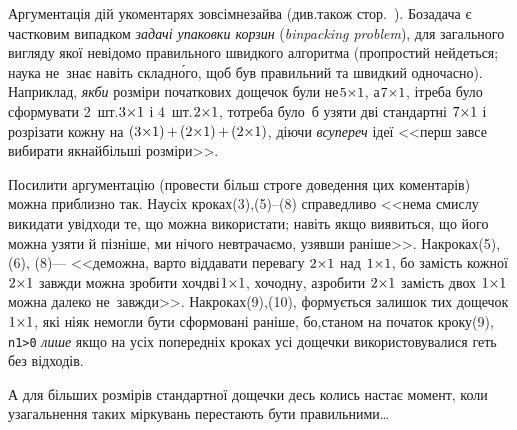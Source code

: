 Аргументація дій у\nolinebreak[3] коментарях зовсім\nolinebreak[1] не\nolinebreak[3] зайва
(див.\nolinebreak[2] також стор.~\pageref{text:need-or-no-need-to-prove}). Бо\nolinebreak[3] задача є частковим випадком \emph{задачі упаковки корзин} (\emph{bin\nolinebreak[1] packing problem}), для загального вигляду якої не\nolinebreak[3] відомо правильного швидкого алгоритма (про\nolinebreak[1] простий не\nolinebreak[3] йдеться; наука не~знає навіть складн\'{о}го, щоб був правильний та швидкий одночасно). Наприклад, \emph{якби} розміри початкових дощечок були не\nolinebreak[3] $5{\times}1$, а\nolinebreak[3] $7{\times}1$, і\nolinebreak[3] треба було сформувати 2~шт.\nolinebreak[3] $3{\times}1$ і 4~шт.\nolinebreak[3] $2{\times}1$, то\nolinebreak[3] треба було~б узяти дві стандартні $7{\times}1$ і розрізати кожну на $(3{\*}1)\dib{{+}}(2{\*}1)\dib{{+}}(2{\*}1)$, діючи \emph{всупереч} ідеї <<перш за\nolinebreak[3] все вибирати якнайбільші розміри>>.

Посилити аргументацію (провести більш строге доведення цих коментарів) можна приблизно так. На\nolinebreak[2] усіх кроках\nolinebreak[2] (3),\nolinebreak[1] \mbox{(5)--(8)} справедливо <<нема смислу викидати у\nolinebreak[3] відходи те, що можна використати; навіть якщо виявиться, що його можна узяти й пізніше, ми нічого не\nolinebreak[3] втрачаємо, узявши раніше>>. 
\label{text:proof-example-parket-1}
На\nolinebreak[3] кроках\nolinebreak[3] (5), \nolinebreak[1] (6), \nolinebreak[1] (8)\nolinebreak[3] --- <<де\nolinebreak[3] можна, варто віддавати перевагу $2{\times}1$ над $1{\times}1$, бо замість кожної $2{\times}1$ завжди можна зробити хоч\nolinebreak[1] дві\nolinebreak[3] $1{\times}1$, хоч\nolinebreak[1] одну, а\nolinebreak[3] зробити $2{\times}1$ замість двох $1{\times}1$ можна далеко не~завжди>>. На\nolinebreak[3] кроках\nolinebreak[2] (9),\nolinebreak[3] (10), формується залишок тих дощечок\nolinebreak[3] $1{\times}1$, які ніяк не\nolinebreak[3] могли бути сформовані раніше, бо,\nolinebreak[2] станом на початок кроку\nolinebreak[3] (9), \verb"n1>0" \emph{лише} якщо на усіх попередніх кроках усі дощечки використовувалися геть без відходів.

А для більших розмірів стандартної дощечки десь колись настає момент, коли узагальнення таких міркувань перестають бути правильними\dots